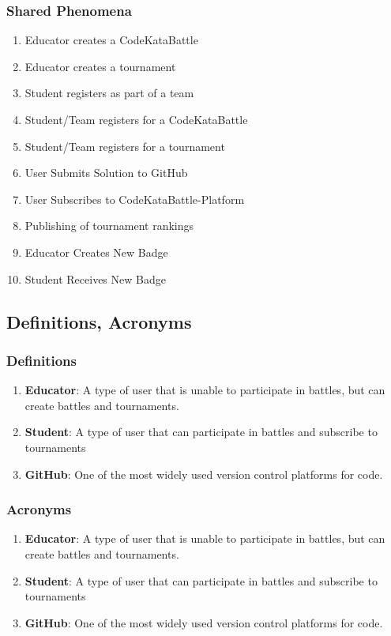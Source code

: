 \subsubsection{Shared Phenomena}
\begin{enumerate}
    \item Educator creates a CodeKataBattle
    \item Educator creates a tournament
    \item Student registers as part of a team
    \item Student/Team registers for a CodeKataBattle
    \item Student/Team registers for a tournament
    \item User Submits Solution to GitHub
    \item User Subscribes to CodeKataBattle-Platform
    \item Publishing of tournament rankings
    \item Educator Creates New Badge
    \item Student Receives New Badge
\end{enumerate}

\subsection{Definitions, Acronyms}
\subsubsection{Definitions}
\begin{enumerate}
    \item \textbf{Educator}: A type of user that is unable to participate in battles, but can create battles and tournaments.  
    \item \textbf{Student}: A type of user that  can participate in battles and subscribe to tournaments
    \item \textbf{GitHub}: One of the most widely used version control platforms for code. 
\end{enumerate}

\subsubsection{Acronyms}
\begin{enumerate}
    \item \textbf{Educator}: A type of user that is unable to participate in battles, but can create battles and tournaments.  
    \item \textbf{Student}: A type of user that  can participate in battles and subscribe to tournaments
    \item \textbf{GitHub}: One of the most widely used version control platforms for code. 
\end{enumerate}

